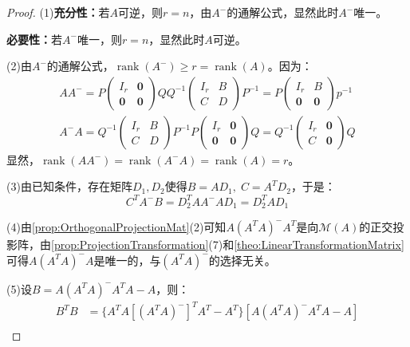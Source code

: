 \begin{proof}
	(1)\textbf{充分性：}若$A$可逆，则$r=n$，由$A^-$的通解公式，显然此时$A^-$唯一。\par
	\textbf{必要性：}若$A^-$唯一，则$r=n$，显然此时$A$可逆。\par
	(2)由$A^-$的通解公式，$\operatorname{rank}(A^-)\geqslant r=\operatorname{rank}(A)$。因为：
	\begin{gather*}
		AA^-=P
		\begin{pmatrix}
			I_r & \mathbf{0} \\
			\mathbf{0} & \mathbf{0}
		\end{pmatrix}
		QQ^{-1}
		\begin{pmatrix}
			I_r & B \\
			C & D
		\end{pmatrix}
		P^{-1}
		=P
		\begin{pmatrix}
			I_r & B \\
			\mathbf{0} & \mathbf{0}
		\end{pmatrix}
		p^{-1} \\
		A^-A=Q^{-1}
		\begin{pmatrix}
			I_r & B \\
			C & D
		\end{pmatrix}
		P^{-1}P
		\begin{pmatrix}
			I_r & \mathbf{0} \\
			\mathbf{0} & \mathbf{0}
		\end{pmatrix}
		Q
		=Q^{-1}
		\begin{pmatrix}
			I_r & \mathbf{0} \\
			C & \mathbf{0}
		\end{pmatrix}
		Q
	\end{gather*}
	显然，$\operatorname{rank}(AA^-)=\operatorname{rank}(A^-A)=\operatorname{rank}(A)=r$。\par
	(3)由已知条件，存在矩阵$D_1,D_2$使得$B=AD_1,\;C=A^TD_2$，于是：
	\begin{equation*}
		C^TA^-B=D_2^TAA^-AD_1=D_2^TAD_1
	\end{equation*}\par
	(4)由\cref{prop:OrthogonalProjectionMat}(2)可知$A(A^TA)^-A^T$是向$\mathcal{M}(A)$的正交投影阵，由\cref{prop:ProjectionTransformation}(7)和\cref{theo:LinearTransformationMatrix}可得$A(A^TA)^-A$是唯一的，与$(A^TA)^-$的选择无关。\par
	(5)设$B=A(A^TA)^-A^TA-A$，则：
	\begin{align*}
		B^TB
		&=\{A^TA[(A^TA)^-]^TA^T-A^T\}[A(A^TA)^-A^TA-A] \\

\end{align*}
\end{proof}
